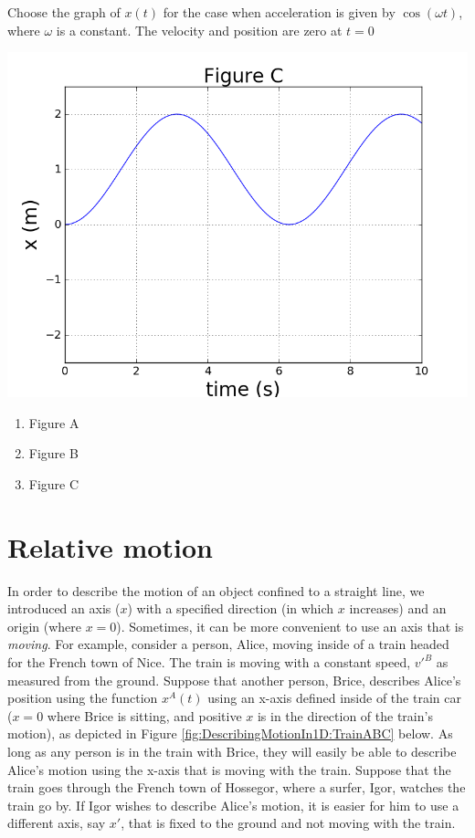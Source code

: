 \begin{checkpointSA}{Choose the graph of $x(t)$ for the case when acceleration is given by $\cos(\omega t)$, where $\omega$ is a constant. The velocity and position are zero at $t=0$}
\begin{center}
\includegraphics[scale=0.25]{figures/DescribingMotionin1D/XfromAcheckpointFigC.png}
\end{center}
\begin{enumerate}[label=\Alph*)]
\item Figure A
\item Figure B
\item Figure C
\end{enumerate}
\end{checkpointSA}



\section{Relative motion}
In order to describe the motion of an object confined to a straight line, we introduced an axis ($x$) with a specified direction (in which $x$ increases) and an origin (where $x=0$). Sometimes, it can be more convenient to use an axis that is \textit{moving}. For example, consider a person, Alice, moving inside of a train headed for the French town of Nice. The train is moving with a constant speed, $v'^B$ as measured from the ground. Suppose that another person, Brice, describes Alice's position using the function $x^A(t)$ using an x-axis defined inside of the train car ($x=0$ where Brice is sitting, and positive $x$ is in the direction of the train's motion), as depicted in Figure \ref{fig:DescribingMotionIn1D:TrainABC} below. As long as any person is in the train with Brice, they will easily be able to describe Alice's motion using the x-axis that is moving with the train. Suppose that the train goes through the French town of Hossegor, where a surfer, Igor, watches the train go by. If Igor wishes to describe Alice's motion, it is easier for him to use a different axis, say $x'$, that is fixed to the ground and not moving with the train. 

